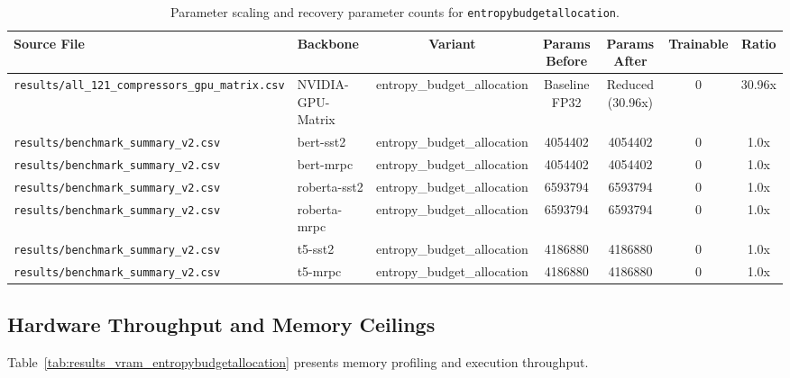 \begin{table}[t]
\centering
\small
\begin{tabular}{llccccc}
\toprule
\textbf{Source File} & \textbf{Backbone} & \textbf{Variant} & \textbf{Params Before} & \textbf{Params After} & \textbf{Trainable} & \textbf{Ratio} \\
\midrule
\texttt{results/all\_121\_compressors\_gpu\_matrix.csv} & NVIDIA-GPU-Matrix & entropy\_budget\_allocation & Baseline FP32 & Reduced (30.96x) & 0 & 30.96x \\
\texttt{results/benchmark\_summary\_v2.csv} & bert-sst2 & entropy\_budget\_allocation & 4054402 & 4054402 & 0 & 1.0x \\
\texttt{results/benchmark\_summary\_v2.csv} & bert-mrpc & entropy\_budget\_allocation & 4054402 & 4054402 & 0 & 1.0x \\
\texttt{results/benchmark\_summary\_v2.csv} & roberta-sst2 & entropy\_budget\_allocation & 6593794 & 6593794 & 0 & 1.0x \\
\texttt{results/benchmark\_summary\_v2.csv} & roberta-mrpc & entropy\_budget\_allocation & 6593794 & 6593794 & 0 & 1.0x \\
\texttt{results/benchmark\_summary\_v2.csv} & t5-sst2 & entropy\_budget\_allocation & 4186880 & 4186880 & 0 & 1.0x \\
\texttt{results/benchmark\_summary\_v2.csv} & t5-mrpc & entropy\_budget\_allocation & 4186880 & 4186880 & 0 & 1.0x \\
\bottomrule
\end{tabular}
\caption{Parameter scaling and recovery parameter counts for \texttt{entropybudgetallocation}.}
\label{tab:results_params_entropybudgetallocation}
\end{table}

\subsection{Hardware Throughput and Memory Ceilings}
Table~\ref{tab:results_vram_entropybudgetallocation} presents memory profiling and execution throughput.

